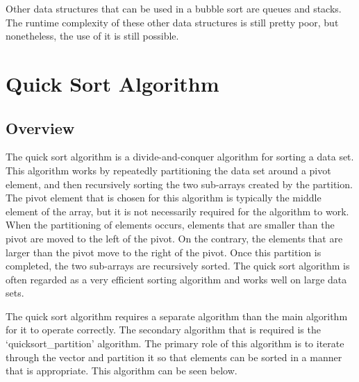 \documentclass[a4paper,9pt]{article}
\begin{document}
\noindent Other data structures that can be used in a bubble sort are queues and stacks. The runtime complexity of these other data structures is still pretty poor, but nonetheless, the use of it is still possible. 

\clearpage

\section*{Quick Sort Algorithm}

\subsection*{Overview}

The quick sort algorithm is a divide-and-conquer algorithm for sorting a data set. This algorithm works by repeatedly partitioning the data set around a pivot element, and then recursively sorting the two sub-arrays
created by the partition. The pivot element that is chosen for this algorithm is typically the middle element of the array, but it is not necessarily required for the algorithm to work. When the partitioning of elements
occurs, elements that are smaller than the pivot are moved to the left of the pivot. On the contrary, the elements that are larger than the pivot move to the right of the pivot. Once this partition is completed, the two
sub-arrays are recursively sorted. The quick sort algorithm is often regarded as a very efficient sorting algorithm and works well on large data sets.

The quick sort algorithm requires a separate algorithm than the main algorithm for it to operate correctly. The secondary algorithm that is required is the `quicksort\_partition' algorithm. The primary role of this algorithm
is to iterate through the vector and partition it so that elements can be sorted in a manner that is appropriate. This algorithm can be seen below.
\end{document}
